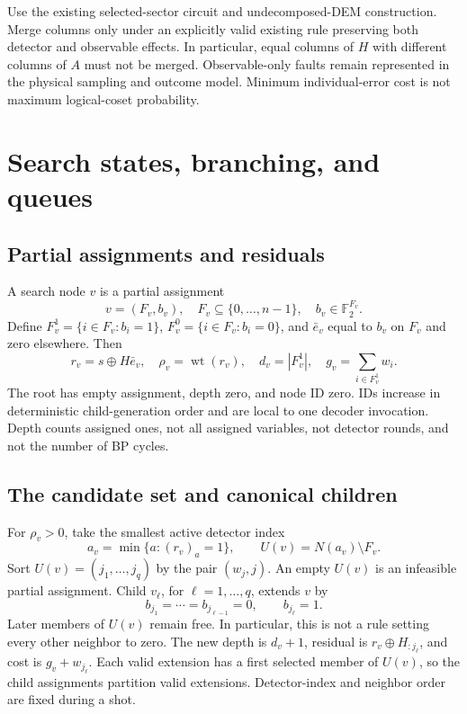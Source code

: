 \documentclass[11pt,a4paper]{article}
\newcommand{\F}{\mathbb F_2}
\newcommand{\wt}{\operatorname{wt}}
\begin{document}
Use the existing selected-sector circuit and undecomposed-DEM construction. Merge columns only under an explicitly valid existing rule preserving both detector and observable effects. In particular, equal columns of $H$ with different columns of $A$ must not be merged. Observable-only faults remain represented in the physical sampling and outcome model. Minimum individual-error cost is not maximum logical-coset probability.

\section{Search states, branching, and queues}
\subsection{Partial assignments and residuals}
A search node $v$ is a partial assignment
\begin{equation}
 v=(F_v,b_v),\quad F_v\subseteq\{0,\ldots,n-1\},\quad b_v\in\F^{F_v}.
\end{equation}
Define $F_v^1=\{i\in F_v:b_i=1\}$, $F_v^0=\{i\in F_v:b_i=0\}$, and $\bar e_v$ equal to $b_v$ on $F_v$ and zero elsewhere. Then
\begin{equation}
 r_v=s\oplus H\bar e_v,\quad \rho_v=\wt(r_v),\quad
 d_v=|F_v^1|,\quad g_v=\sum_{i\in F_v^1}w_i.
\end{equation}
The root has empty assignment, depth zero, and node ID zero. IDs increase in deterministic child-generation order and are local to one decoder invocation. Depth counts assigned ones, not all assigned variables, not detector rounds, and not the number of BP cycles.

\subsection{The candidate set and canonical children}
For $\rho_v>0$, take the smallest active detector index
\begin{equation}
 a_v=\min\{a:(r_v)_a=1\},\qquad
 U(v)=N(a_v)\setminus F_v.
\end{equation}
Sort $U(v)=(j_1,\ldots,j_q)$ by the pair $(w_j,j)$. An empty $U(v)$ is an infeasible partial assignment. Child $v_\ell$, for $\ell=1,\ldots,q$, extends $v$ by
\begin{equation}\label{eq:branch}
 b_{j_1}=\cdots=b_{j_{\ell-1}}=0,\qquad b_{j_\ell}=1.
\end{equation}
Later members of $U(v)$ remain free. In particular, this is not a rule setting every other neighbor to zero. The new depth is $d_v+1$, residual is $r_v\oplus H_{:j_\ell}$, and cost is $g_v+w_{j_\ell}$. Each valid extension has a first selected member of $U(v)$, so the child assignments partition valid extensions. Detector-index and neighbor order are fixed during a shot.
\end{document}
